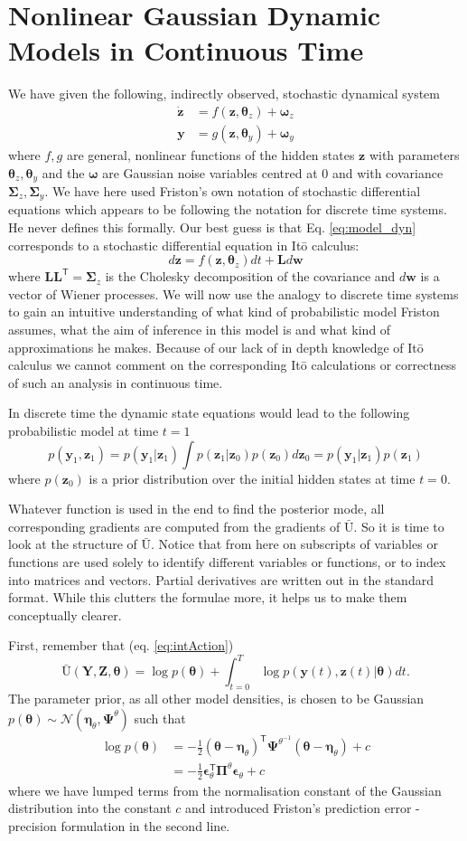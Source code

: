 \documentclass[a4paper,10pt]{article}
\newcommand{\bs}[1]{\mathbf{#1}}					%
\newcommand{\bgs}[1]{\boldsymbol{#1}}				%
\newcommand{\tr}{\mathsf{T}}				%
\newcommand{\eq}[1]{\begin{equation} #1 \end{equation}}%
\renewcommand{\ss}{z}         %
\newcommand{\so}{y}         %
\newcommand{\sn}{\omega} %
\newcommand{\spe}{\epsilon} %
\renewcommand{\sp}{\theta}    %
\newcommand{\ps}{\bs{\ss}}    %
\newcommand{\po}{\bs{\so}}    %
\newcommand{\pn}{\bgs{\sn}} %
\newcommand{\ppe}{\bgs{\spe}} %
\newcommand{\pp}{\bgs{\sp}} %
\newcommand{\Ps}{\bs{Z}}    %
\newcommand{\Po}{\bs{Y}}    %
\newcommand{\Ua}{\bar{\mathrm{U}}}		%
\newcommand{\N}{\mathcal{N}}			%
\newcommand{\Cov}{\bgs{\Sigma}}			%
\newcommand{\Prec}{\bgs{\Pi}}			%
\begin{document}
\section{Nonlinear Gaussian Dynamic Models in Continuous Time}
We have given the following, indirectly observed, stochastic dynamical system
\begin{align}
    \label{eq:model_dyn}\dot{\ps} &= f(\ps, \pp_{\ss}) + \pn_{\ss}\\
    \po &= g(\ps, \pp_{\so}) + \pn_{\so}
\end{align}
where $f, g$ are general, nonlinear functions of the hidden states $\ps$ with parameters $\pp_{\ss}, \pp_{\so}$ and the $\pn$ are Gaussian noise variables centred at 0 and with covariance $\Cov_{\ss}, \Cov_{\so}$. We have here used Friston's own notation of stochastic differential equations which appears to be following the notation for discrete time systems. He never defines this formally. Our best guess is that Eq. \ref{eq:model_dyn} corresponds to a stochastic differential equation in It\={o} calculus:
\[
    d\ps = f(\ps, \pp_{\ss})dt + \bs{L}d\bs{w}
\]
where $\bs{L}\bs{L}^\tr = \Cov_{\ss}$ is the Cholesky decomposition of the covariance and $d\bs{w}$ is a vector of Wiener processes. We will now use the analogy to discrete time systems to gain an intuitive understanding of what kind of probabilistic model Friston assumes, what the aim of inference in this model is and what kind of approximations he makes. Because of our lack of in depth knowledge of It\={o} calculus we cannot comment on the corresponding It\={o} calculations or correctness of such an analysis in continuous time.

In discrete time the dynamic state equations would lead to the following probabilistic model at time $t=1$
\eq{
    p(\po_1, \ps_1) = p(\po_1| \ps_1)\int p(\ps_1|\ps_0)p(\ps_0) d\ps_0 = p(\po_1| \ps_1)p(\ps_1)
}
where $p(\ps_0)$ is a prior distribution over the initial hidden states at time $t=0$.

Whatever function is used in the end to find the posterior mode, all corresponding gradients are computed from the gradients of $\Ua$. So it is time to look at the structure of $\Ua$. Notice that from here on subscripts of variables or functions are used solely to identify different variables or functions, or to index into matrices and vectors. Partial derivatives are written out in the standard format. While this clutters the formulae more, it helps us to make them conceptually clearer.

First, remember that (eq. \ref{eq:intAction})
\[
    \Ua(\Po,\Ps,\pp) = \log p(\pp) + \int_{t=0}^T \log p(\po(t),\ps(t)|\pp)dt.
\]
The parameter prior, as all other model densities, is chosen to be Gaussian $p(\pp)\sim \N(\bgs{\eta}_\sp,\bgs{\Psi}^\sp)$ such that 
\begin{align}
    \log p(\pp) &= -\frac{1}{2}(\pp - \bgs{\eta}_\sp)^\tr\bgs{\Psi}^{\sp^{-1}}(\pp - \bgs{\eta}_\sp) + c\\
    &= -\frac{1}{2}\ppe_\sp^\tr\Prec^{\sp}\ppe_\sp + c
\end{align}
where we have lumped terms from the normalisation constant of the Gaussian distribution into the constant $c$ and introduced Friston's prediction error - precision formulation in the second line.
\end{document}

